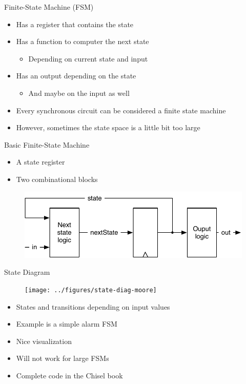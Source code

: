 \begin{frame}[fragile]{Finite-State Machine (FSM)}
\begin{itemize}
\item Has a register that contains the state
\item Has a function to computer the next state
\begin{itemize}
\item Depending on current state and input
\end{itemize}
\item Has an output depending on the state
\begin{itemize}
\item And maybe on the input as well
\end{itemize}
\item Every synchronous circuit can be considered a finite state machine
\item However, sometimes the state space is a little bit too large
\end{itemize}
\end{frame}

\begin{frame}[fragile]{Basic Finite-State Machine}
\begin{itemize}
\item A state register
\item Two combinational blocks
\end{itemize}
\begin{figure}
  \includegraphics[scale=\scale]{../figures/fsm}
\end{figure}
\end{frame}

\begin{frame}[fragile]{State Diagram}
\begin{figure}
  \texttt{[image: ../figures/state-diag-moore]}
\end{figure}
\begin{itemize}
\item States and transitions depending on input values
\item Example is a simple alarm FSM
\item Nice visualization
\item Will not work for large FSMs
\item Complete code in the Chisel book
\end{itemize}
\end{frame}


